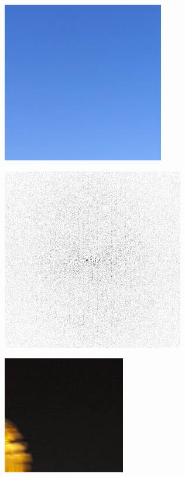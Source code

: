 \begin{figure}[H]
\begin{minipage}[h]{0.45\linewidth}
\includegraphics[width=0.5\linewidth, right]{pics/bad_ceps/sky.PNG} \\ 
\end{minipage}
\hfill
\begin{minipage}[h]{0.45\linewidth}
\includegraphics[width=0.5\linewidth, left]{pics/synth_blur/i1.png} \\ 
\end{minipage}
    \vfill
\begin{minipage}[h]{0.45\linewidth}
\includegraphics[width=0.5\linewidth, right]{pics/bad_ceps/sky1.PNG} \\ 

\end{minipage}
\end{figure}
